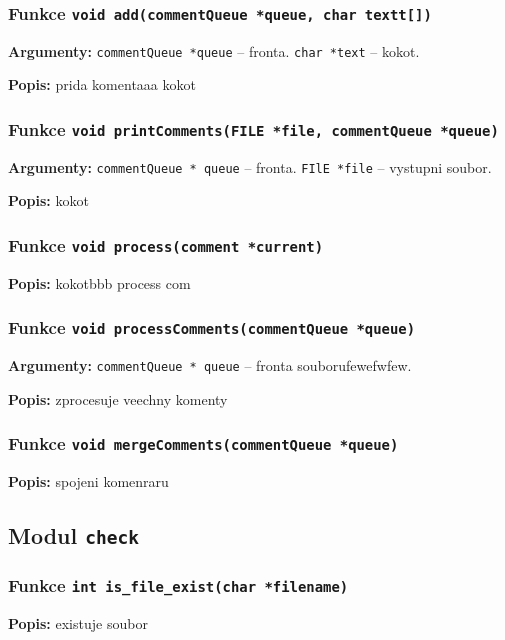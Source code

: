 \documentclass[12pt, a4paper]{article}
\begin{document}
\subsubsection{Funkce \texttt{void add(commentQueue *queue, char textt[])}}
\textbf{Argumenty: }\verb"commentQueue *queue" -- fronta. \verb"char *text" -- kokot. \\
\par\noindent
\textbf{Popis: }prida komentaaa kokot\\
\par\noindent
\subsubsection{Funkce \texttt{void printComments(FILE *file, commentQueue *queue)}}
\textbf{Argumenty: }\verb"commentQueue * queue" -- fronta. \verb"FIlE *file" -- vystupni soubor. \\
\par\noindent
\textbf{Popis: }kokot\\
\par\noindent
\subsubsection{Funkce \texttt{void process(comment *current)}}
\textbf{Popis: }kokotbbb process com\\
\par\noindent
\subsubsection{Funkce \texttt{void processComments(commentQueue *queue)}}
\textbf{Argumenty: }\verb"commentQueue * queue" -- fronta souborufewefwfew. \\
\par\noindent
\textbf{Popis: }zprocesuje veechny komenty\\
\par\noindent
\subsubsection{Funkce \texttt{void mergeComments(commentQueue *queue)}}
\textbf{Popis: }spojeni komenraru\\
\par\noindent
\subsection{Modul \texttt{check}}
\subsubsection{Funkce \texttt{int is\_file\_exist(char *filename)}}
\textbf{Popis: }existuje soubor\\
\par\noindent
\end{document}
